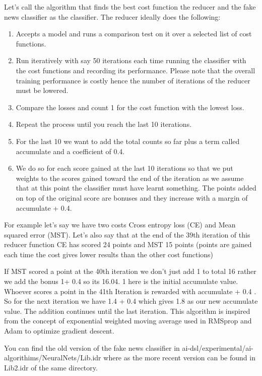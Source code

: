 \documentclass[]{report}
\begin{document}
Let’s call the algorithm that finds the best cost function the reducer and the fake news classifier as the classifier. 
The reducer ideally does the following:

\begin{enumerate}
\item  Accepts a model and runs a comparison test on it over a selected list of cost functions.
\item Run iteratively with say 50 iterations each time running the classifier with 
the cost functions and recording its performance. Please note that the overall 
training performance is costly hence the number of iterations of the reducer must be lowered.
\item Compare the losses and count 1 for the cost function with the lowest loss.
\item Repeat the process until you reach the last 10 iterations. 
\item For the last 10 we want to add the total counts 
so far plus a term called accumulate and a coefficient of 0.4. 
\item We do so for each score gained at the last 10 iterations so that we put weights 
to the scores gained toward the end of the iteration as we assume that at this point 
the classifier must have learnt something. The points added on top of the original 
score are bonuses and they increase with a margin of accumulate + 0.4.
\end{enumerate}


For example let’s say we have two costs Cross entropy loss (CE) and Mean squared error (MST).  
Let's also say that at the end of the 39th iteration of this reducer function CE 
has scored 24 points and MST 15 points (points are gained  each time the cost gives lower results than the other cost functions)

If MST scored a point at the 40th iteration we don’t just add 1 to total 16 rather we add the bonus 1+ 0.4 so its 16.04. 
1 here is the initial accumulate value. Whoever scores a point in the 41th 
Iteration is rewarded with accumulate + 0.4 . So for the next iteration we have 1.4 + 0.4 which gives 1.8 
as our new accumulate value. The addition continues until the last iteration. This algorithm is inspired 
from the concept of exponential weighted moving average used in RMSprop and Adam to optimize gradient descent.  

You can find the old version of the fake news classifier in ai-dsl/experimental/ai-algorithims/NeuralNets/Lib.idr 
where as the more recent version can be found in Lib2.idr of the same directory.
\end{document}
